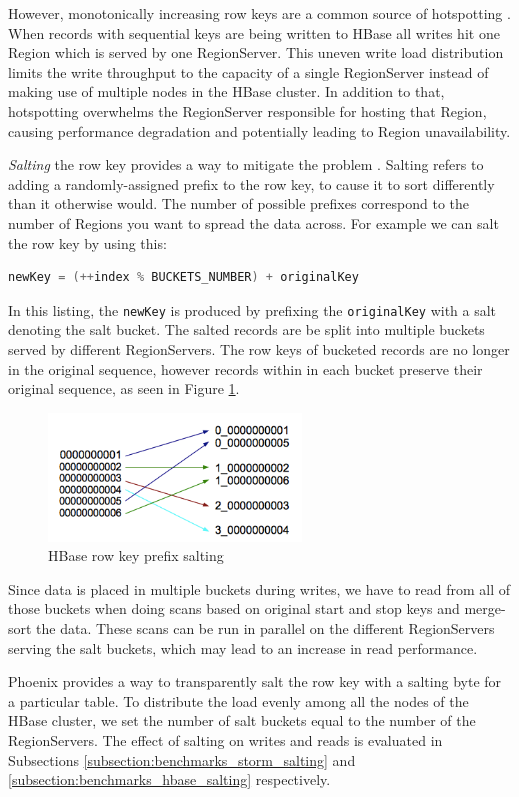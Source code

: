 However, monotonically increasing row keys are a common source of hotspotting \cite{salting_sematext}. When records with sequential keys are being written to HBase all writes hit one Region which is served by one RegionServer. This uneven write load distribution limits the write throughput to the capacity of a single RegionServer instead of making use of multiple nodes in the HBase cluster. In addition to that, hotspotting overwhelms the RegionServer responsible for hosting that Region, causing performance degradation and potentially leading to Region unavailability.

\emph{Salting} the row key provides a way to mitigate the problem \cite{salting_phoenix,salting_sematext}. Salting refers to adding a randomly-assigned prefix to the row key, to cause it to sort differently than it otherwise would. The number of possible prefixes correspond to the number of Regions you want to spread the data across. For example we can salt the row key by using this:

\begin{lstlisting}[language=C]
newKey = (++index % BUCKETS_NUMBER) + originalKey
\end{lstlisting}

In this listing, the \texttt{newKey} is produced by prefixing the \texttt{originalKey} with a salt denoting the salt bucket. The salted records are be split into multiple buckets served by different RegionServers. The row keys of bucketed records are no longer in the original sequence, however records within in each bucket preserve their original sequence, as seen in Figure \ref{figure:optimizations_salting}.

\begin{figure}[H]
\centering
\includegraphics[width=0.6\textwidth]{figures/optimizations_salting}
\caption{HBase row key prefix salting}
\label{figure:optimizations_salting}
\end{figure}

Since data is placed in multiple buckets during writes, we have to read from all of those buckets when doing scans based on original start and stop keys and merge-sort the data. These scans can be run in parallel on the different RegionServers serving the salt buckets, which may lead to an increase in read performance.

Phoenix provides a way to transparently salt the row key with a salting byte for a particular table. To distribute the load evenly among all the nodes of the HBase cluster, we set the number of salt buckets equal to the number of the RegionServers. The effect of salting on writes and reads is evaluated in Subsections \ref{subsection:benchmarks_storm_salting} and \ref{subsection:benchmarks_hbase_salting} respectively.


\cleardoublepage
